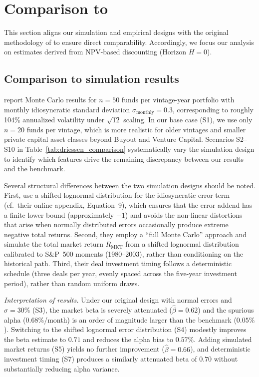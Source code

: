 \section{Comparison to \cite{DLP12}}
\label{sec:dlp_results_comparison}

This section aligns our simulation and empirical designs with the original methodology of \cite{DLP12} to ensure direct comparability. 
Accordingly, we focus our analysis on estimates derived from NPV-based discounting (Horizon $H=0$).

\subsection{Comparison to simulation results}
\label{sec:dlp_simulation}

\cite[Table 1]{DLP12} report Monte Carlo results for $n=50$ funds per vintage-year portfolio with monthly idiosyncratic standard deviation $\sigma_{\text{monthly}}=0.3$, corresponding to roughly 104\% annualized volatility under $\sqrt{12}$ scaling.
In our base case (S1), we use only $n=20$ funds per vintage, which is more realistic for older vintages and smaller private capital asset classes beyond Buyout and Venture Capital.
Scenarios S2--S10 in Table~\ref{tab:driessen_comparison} systematically vary the simulation design to identify which features drive the remaining discrepancy between our results and the \cite{DLP12} benchmark.

Several structural differences between the two simulation designs should be noted.
First, \cite{DLP12} use a shifted lognormal distribution for the idiosyncratic error term (cf.\ their online appendix, Equation~9), which ensures that the error addend has a finite lower bound (approximately $-1$) and avoids the non-linear distortions that arise when normally distributed errors occasionally produce extreme negative total returns.
Second, they employ a ``full Monte Carlo'' approach and simulate the total market return $R_{\text{MKT}}$ from a shifted lognormal distribution calibrated to S\&P~500 moments (1980--2003), rather than conditioning on the historical path.
Third, their deal investment timing follows a deterministic schedule (three deals per year, evenly spaced across the five-year investment period), rather than random uniform draws.

\textit{Interpretation of results.}\quad
Under our original design with normal errors and $\sigma=30\%$ (S3), the market beta is severely attenuated ($\hat{\beta}=0.62$) and the spurious alpha ($0.68\%$/month) is an order of magnitude larger than the benchmark ($0.05\%$).
Switching to the shifted lognormal error distribution (S4) modestly improves the beta estimate to $0.71$ and reduces the alpha bias to $0.57\%$.
Adding simulated market returns (S5) yields no further improvement ($\hat{\beta}=0.66$), and deterministic investment timing (S7) produces a similarly attenuated beta of $0.70$ without substantially reducing alpha variance.

